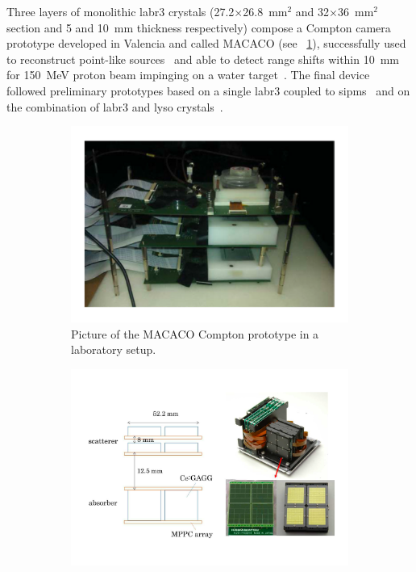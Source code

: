 Three layers of monolithic \gls{labr3} crystals (27.2$\times$26.8~mm$^2$ and 32$\times$36~mm$^2$ section and 5 and 10~mm thickness respectively) compose a Compton camera prototype developed in Valencia and called MACACO (see \figurename~\ref{chap2::fig::CC_MACACO}), successfully used to reconstruct point-like sources~\parencite{Llosa2016} and able to detect range shifts within 10~mm for 150~MeV proton beam impinging on a water target~\parencite{Solevi2016}. The final device followed preliminary prototypes based on a single \gls{labr3} coupled to \glspl{sipm}~\parencite{Llosa2012} and on the combination of \gls{labr3} and \gls{lyso} crystals~\parencite{Llosa2013}.

\begin{figure}
\centering
\begin{subfigure}[t]{.49\textwidth}
\hspace{-0.7cm}\includegraphics[width=1.2\linewidth]{03_GraphicFiles/chapter2_GammaCameras/MACACO.pdf}
\caption{Picture of the MACACO Compton prototype in a laboratory setup.}
\label{chap2::fig::CC_MACACO}
\end{subfigure}
\begin{subfigure}[t]{.49\textwidth}
\hspace{-0.7cm}\includegraphics[width=1.2\linewidth]{03_GraphicFiles/chapter2_GammaCameras/HandheldCC.pdf}

\end{subfigure}
\end{figure}
